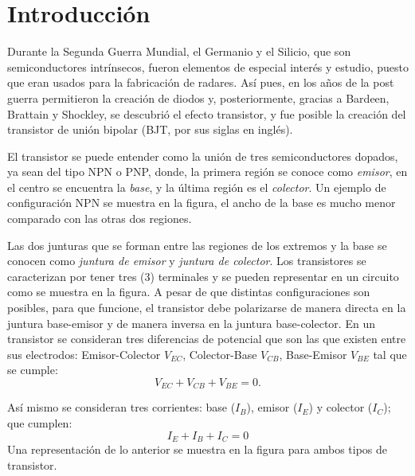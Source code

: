 \section{Introducción}
Durante la Segunda Guerra Mundial, el Germanio y el Silicio, que son semiconductores intrínsecos, fueron elementos de especial interés y estudio, puesto que eran usados para la fabricación de radares. Así pues, en los años de la post guerra permitieron la creación de diodos y, posteriormente, gracias a Bardeen, Brattain y Shockley, se descubrió el efecto transistor, y fue posible la creación del transistor de unión bipolar (BJT, por sus siglas en inglés).

El transistor se puede entender como la unión de tres semiconductores dopados, ya sean del tipo NPN o PNP, donde,  la primera región se conoce como \textit{emisor}, en el centro se encuentra la \textit{base}, y la última región es el \textit{colector}. Un ejemplo de configuración NPN se muestra en la figura, el ancho de la base es mucho menor comparado con las otras dos regiones.

Las dos junturas que se forman entre las regiones de los extremos y la base se conocen como \textit{juntura de emisor} y \textit{juntura de colector}. Los transistores se caracterizan por tener tres (3) terminales y se pueden representar en un circuito como se muestra en la figura. A pesar de que distintas configuraciones son posibles, para que funcione, el transistor debe polarizarse de manera directa en la juntura base-emisor y de manera inversa en la juntura base-colector.
En un transistor se consideran tres diferencias de potencial que son las que existen entre sus electrodos: Emisor-Colector $V_{EC}$, Colector-Base $V_{CB}$, Base-Emisor $V_{BE}$ tal que se cumple:
\begin{equation}
    V_{EC}+V_{CB}+V_{BE} = 0.
\end{equation}

Así mismo se consideran tres corrientes: base ($I_{B}$), emisor ($I_{E}$) y colector ($I_{C}$); que cumplen:
\begin{equation}
    I_{E}+I_{B}+I_{C} = 0
\end{equation}
Una representación de lo anterior se muestra en la figura para ambos tipos de transistor.

